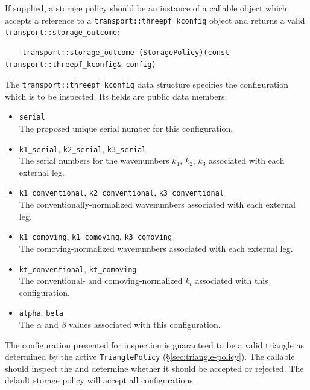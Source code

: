 \documentclass[11pt,a4paper]{article}
\newcommand{\texit}{t_{\text{exit}}}
\newcommand{\tmassless}{t_{\text{massless}}}
\begin{document}
If supplied, a storage policy should be an instance of a callable object
which accepts a reference to a \texttt{transport::threepf_kconfig}
object and returns a valid \texttt{transport::storage_outcome}:
\begin{verbatim}
    transport::storage_outcome (StoragePolicy)(const transport::threepf_kconfig& config)
\end{verbatim}
The \texttt{transport::threepf_kconfig} data structure specifies
the configuration which is to be inspected. Its fields are public data members:
\begin{itemize}
    \item \texttt{serial} \\
    The proposed unique serial number for this configuration.
    
    \item \texttt{k1_serial}, \texttt{k2_serial}, \texttt{k3_serial} \\
    The serial numbers for the wavenumbers $k_1$, $k_2$, $k_3$ associated with each external leg.
    
    \item \texttt{k1_conventional}, \texttt{k2_conventional}, \texttt{k3_conventional} \\
    The conventionally-normalized wavenumbers associated with each external leg.
    
    \item \texttt{k1_comoving}, \texttt{k1_comoving}, \texttt{k3_comoving} \\
    The comoving-normalized wavenumbers associated with each external leg.
    
    \item \texttt{kt_conventional}, \texttt{kt_comoving} \\
    The conventional- and comoving-normalized $k_t$ associated with this configuration.
    
    \item \texttt{alpha}, \texttt{beta} \\
    The $\alpha$ and $\beta$ values associated with this configuration.
    
\end{itemize}
The configuration presented for inspection is guaranteed to be a valid triangle as determined by the
active \texttt{TrianglePolicy} (\S\ref{sec:triangle-policy}).
The callable should inspect the and determine whether it should be accepted or rejected.
The default storage policy will accept all configurations.
\end{document}
